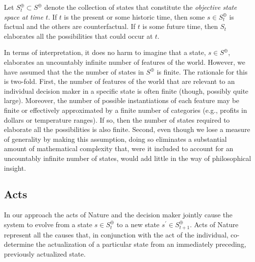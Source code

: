 \documentclass[
11pt,
titlepage,
reqno,
]{article}%
\theoremstyle{definition}
\begin{document}
Let $S^\oplus_t\subset S^\oplus$ denote the collection of states that constitute the \textit{objective state space at time $t$}. 
If $t$ is the present or some historic time, then some  $s\in S^\oplus_t$ is factual and the others are counterfactual. 
If $t$ is some future time, then $S_t$ elaborates all the possibilities that could occur at $t$.

In terms of interpretation, it does no harm to imagine that a state, $s\in S^\oplus$, elaborates an uncountably infinite number of features of the world.
However,  we have assumed that the the number of states in $S^\oplus$ is finite.
The rationale for this is two-fold.
First, the number of features of the world that are relevant to an individual decision maker in a specific state is often finite (though, possibly quite large).
Moreover, the number of possible instantiations of each feature may be finite or effectively approximated by a finite number of  categories (e.g., profits in dollars or temperature ranges).
If so, then the number of states required to elaborate all the possibilities is also finite.
Second, even  though we lose a measure of generality by making this assumption, doing so eliminates a substantial amount of mathematical complexity that, were it included to account for an uncountably infinite number of states, would add little in the way of philosophical insight.

	
	
	
\subsection{Acts}\label{sec:acts}
	
In our approach the acts of Nature and the decision maker jointly cause the system to evolve from a state $s\in S^\oplus_t$ to a new state $s^\prime\in S^\oplus_{t+1}$.
Acts of Nature represent all the causes that, in conjunction with the act of the individual, co-determine the actualization of a particular state from an immediately preceding, previously actualized state.
	
\end{document}
